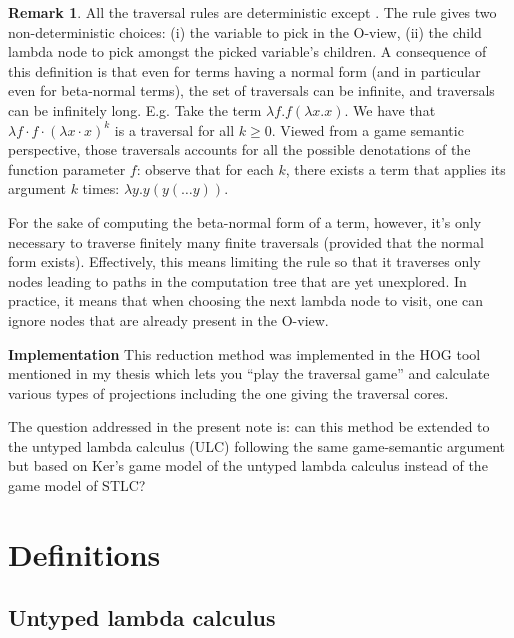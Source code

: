 \documentclass{article}
\theoremstyle{definition}
\newtheorem{remark}{Remark}[section]
\begin{document}
\begin{remark}
All the traversal rules are deterministic except . The rule  gives two non-deterministic choices: (i) the variable to pick in the O-view,
(ii) the child lambda node to pick amongst the picked variable's children.
A consequence of this definition is that even for terms having a normal form (and in particular even for beta-normal terms), the set of traversals can be infinite, and traversals can be infinitely long.
E.g. Take the term $\lambda f . f (\lambda x. x)$. We have that $\lambda f \cdot f \cdot (\lambda x \cdot  x)^k$ is a traversal for all $k\geq0$. Viewed from a game semantic perspective, those traversals accounts for all the possible denotations of the function parameter $f$: observe that for each $k$, there exists a term that applies its argument $k$ times: $\lambda y . y (y ( \ldots y)) $.

For the sake of computing the beta-normal form of a term, however, it's only necessary to traverse finitely many finite traversals (provided that the normal form exists). Effectively, this means limiting the rule  so that it traverses only nodes leading to paths in the computation tree that are yet unexplored. In practice, it means that when choosing the next lambda node to visit, one can ignore nodes that are already present in the O-view.
\end{remark}

\textbf{Implementation}
This reduction method was implemented in the HOG tool mentioned in my thesis which lets you ``play the traversal game'' and calculate various types of projections including the one giving the traversal cores.

The question addressed in the present note is: can this method be extended to the untyped lambda calculus (ULC) following the same game-semantic argument but based on Ker's game model of the untyped lambda calculus instead of the game model of STLC?


\section{Definitions}

\subsection{Untyped lambda calculus}
\end{document}
